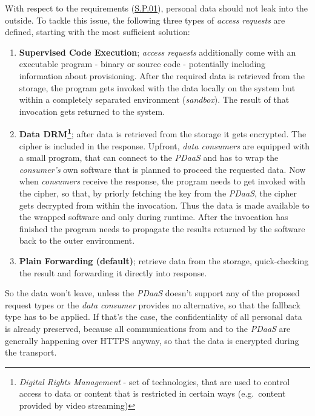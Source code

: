 \documentclass[12pt,english,a4paper,titlepage,cleardoublepage=empty,dottedtoc]{report}
\providecommand{\tightlist}{%
  \setlength{\itemsep}{0pt}\setlength{\parskip}{0pt}}
\begin{document}
With respect to the requirements (\protect\hyperlink{sp01}{S.P.01}),
personal data should not leak into the outside. To tackle this issue,
the following three types of \emph{access requests} are defined,
starting with the most sufficient solution:

\begin{enumerate}
\def\labelenumi{(\Alph{enumi})}
\tightlist
\item
  \textbf{Supervised Code Execution}; \emph{access requests}
  additionally come with an executable program - binary or source code -
  potentially including information about provisioning. After the
  required data is retrieved from the storage, the program gets invoked
  with the data locally on the system but within a completely separated
  environment (\emph{sandbox}). The result of that invocation gets
  returned to the system.
\item
  \textbf{Data DRM\footnote{\emph{Digital Rights Management} - set of
    technologies, that are used to control access to data or content
    that is restricted in certain ways (e.g.~content provided by video
    streaming)}}; after data is retrieved from the storage it gets
  encrypted. The cipher is included in the response. Upfront, \emph{data
  consumers} are equipped with a small program, that can connect to the
  \emph{PDaaS} and has to wrap the \emph{consumer's} own software that
  is planned to proceed the requested data. Now when \emph{consumers}
  receive the response, the program needs to get invoked with the
  cipher, so that, by priorly fetching the key from the \emph{PDaaS},
  the cipher gets decrypted from within the invocation. Thus the data is
  made available to the wrapped software and only during runtime. After
  the invocation has finished the program needs to propagate the results
  returned by the software back to the outer environment.
\item
  \textbf{Plain Forwarding (default)}; retrieve data from the storage,
  quick-checking the result and forwarding it directly into response.
\end{enumerate}

So the data won't leave, unless the \emph{PDaaS} doesn't support any of
the proposed request types or the \emph{data consumer} provides no
alternative, so that the fallback type has to be applied. If that's the
case, the confidentiality of all personal data is already preserved,
because all communications from and to the \emph{PDaaS} are generally
happening over HTTPS anyway, so that the data is encrypted during the
transport.
\end{document}
